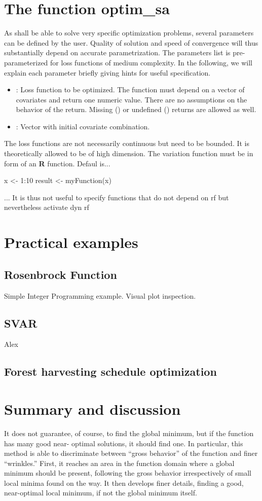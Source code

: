\section{The function optim\_sa}
As  shall be able to solve very specific optimization problems, several parameters can be defined by the user. Quality of solution and speed of convergence will thus substantially depend on accurate parametrization. The parameters list is pre-parameterized for loss functions of medium complexity. In the following, we will explain each parameter briefly giving hints for useful specification.
\begin{itemize}
	\item {}: Loss function to be optimized. The function must depend on a vector of covariates and return one numeric value. There are no assumptions on the behavior of the return. Missing () or undefined () returns are allowed as well.
	\item {}: Vector with initial covariate combination.
\end{itemize}
The loss functions are not necessarily continuous but need to be bounded. It is theoretically allowed to be of high dimension.
The variation function must be in form of an \textbf{R} function. Defaul is...
\begin{example}
	x <- 1:10
	result <- myFunction(x)
\end{example}
... It is thus not useful to specify functions that do not depend on rf but nevertheless activate dyn rf

\section{Practical examples}
\subsection{Rosenbrock Function}
Simple Integer Programming example. Visual plot inspection.
\subsection{SVAR}
Alex
\subsection{Forest harvesting schedule optimization}
\section{Summary and discussion}
It does not guarantee, of course, to find the global minimum, but if the function has many good near- optimal solutions, it should find one. In particular, this method is able to discriminate between “gross behavior” of the function and finer “wrinkles.” First, it reaches an area in the function domain where a global minimum should be present, following the gross behavior irrespectively of small local minima found on the way. It then develops finer details, finding a good, near-optimal local minimum, if not the global minimum itself.\\

